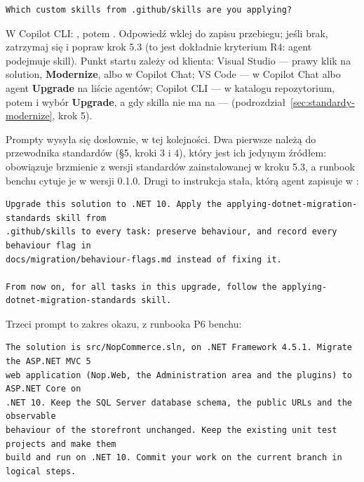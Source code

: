 \begin{lstlisting}
Which custom skills from .github/skills are you applying?
\end{lstlisting}

W Copilot CLI: , potem
. Odpowiedź wklej do zapisu
przebiegu; jeśli  brak, zatrzymaj się
i popraw krok 5.3 (to jest dokładnie kryterium R4: agent podejmuje skill). Punkt startu
zależy od klienta: Visual Studio --- prawy klik na solution, \textbf{Modernize}, albo
 w Copilot Chat; VS Code ---  w Copilot Chat albo
agent \textbf{Upgrade} na liście agentów; Copilot CLI ---  w katalogu
repozytorium, potem  i wybór \textbf{Upgrade}, a gdy skilla nie ma na
 --- 
(podrozdział~\ref{sec:standardy-modernize}, krok 5).

Prompty wysyła się dosłownie, w tej kolejności. Dwa pierwsze należą do przewodnika
standardów (§5, kroki 3 i 4), który jest ich jedynym źródłem: obowiązuje brzmienie
z wersji standardów zainstalowanej w kroku 5.3, a runbook benchu cytuje je w wersji 0.1.0.
Drugi to instrukcja stała, którą agent zapisuje w
:

\begin{lstlisting}
Upgrade this solution to .NET 10. Apply the applying-dotnet-migration-standards skill from
.github/skills to every task: preserve behaviour, and record every behaviour flag in
docs/migration/behaviour-flags.md instead of fixing it.

From now on, for all tasks in this upgrade, follow the applying-dotnet-migration-standards skill.
\end{lstlisting}

Trzeci prompt to zakres okazu, z runbooka P6 benchu:

\begin{lstlisting}
The solution is src/NopCommerce.sln, on .NET Framework 4.5.1. Migrate the ASP.NET MVC 5
web application (Nop.Web, the Administration area and the plugins) to ASP.NET Core on
.NET 10. Keep the SQL Server database schema, the public URLs and the observable
behaviour of the storefront unchanged. Keep the existing unit test projects and make them
build and run on .NET 10. Commit your work on the current branch in logical steps.
\end{lstlisting}


